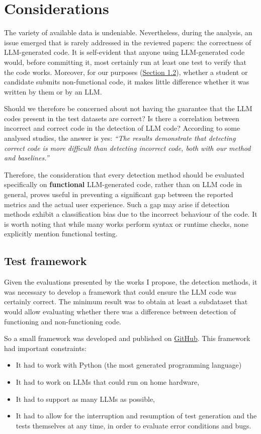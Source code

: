 \clearpage

\section{Considerations}
The variety of available data is undeniable. 
Nevertheless, during the analysis, an issue emerged that is rarely 
addressed in the reviewed papers: the correctness of 
LLM-generated code. It is self-evident that anyone using 
LLM-generated code would, before committing it, 
most certainly run at least one test to verify that the 
code works. Moreover, for our purposes 
(\hyperref[sec:Motivations Behind LLM-Generated Code Detection]{Section 1.2}), 
whether a student or candidate submits non-functional 
code, it makes little difference whether it was written by them or 
by an LLM. 

Should we therefore be concerned about not having the guarantee that the LLM 
codes present in the test datasets are correct? Is there a correlation between 
incorrect and correct code in the detection of LLM code? According to some analysed 
studies, the answer is yes: \textit{``The results demonstrate that detecting correct code is 
more difficult than detecting incorrect code, both with our method and baselines.''}~ 
\cite{ye2023uncovering}

Therefore, the consideration that every detection method 
should be evaluated specifically on \textbf{functional} LLM-generated code, 
rather than on LLM code in general, proves useful in preventing a 
significant gap between the reported metrics and the actual user 
experience. Such a gap may arise if detection methods exhibit a 
classification bias due to the incorrect behaviour of the code. 
It is worth noting that while many works perform syntax or runtime 
checks, none explicitly mention functional testing.


\newpage
\subsection{Test framework}
\label{section:Test framework}
Given the evaluations presented by the works I propose, 
the detection methods, it was necessary to develop a framework that 
could ensure the LLM code was certainly correct. The minimum result was 
to obtain at least a subdataset that would allow evaluating whether there was a 
difference between detection of functioning and non-functioning code.

So a small framework was developed and published on
\href{https://github.com/DelGaudioNunzioSE/Code-LLMsTester.git}{GitHub}.
This framework had important constraints: 
\begin{itemize}
    \item It had to work with Python (the most generated programming language)
    \item It had to work on LLMs that could run on home hardware, 
    \item It had to support as many LLMs as possible, 
    \item It had to allow for the interruption and resumption 
of test generation and the tests themselves at any time, 
in order to evaluate error conditions and bugs.
\end{itemize}

